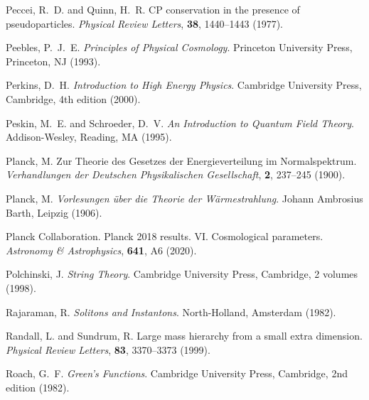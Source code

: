 \documentclass[12pt,a4paper]{article}
\begin{document}
\begin{thebibliography}{99}
		Peccei, R.~D. and Quinn, H.~R.
		\newblock CP conservation in the presence of pseudoparticles.
		\newblock \textit{Physical Review Letters}, \textbf{38}, 1440--1443 (1977).
		\newblock {}
		
		Peebles, P.~J.~E.
		\newblock \textit{Principles of Physical Cosmology}.
		\newblock Princeton University Press, Princeton, NJ (1993).
		
		Perkins, D.~H.
		\newblock \textit{Introduction to High Energy Physics}.
		\newblock Cambridge University Press, Cambridge, 4th edition (2000).
		
		Peskin, M.~E. and Schroeder, D.~V.
		\newblock \textit{An Introduction to Quantum Field Theory}.
		\newblock Addison-Wesley, Reading, MA (1995).
		
		Planck, M.
		\newblock Zur Theorie des Gesetzes der Energieverteilung im Normalspektrum.
		\newblock \textit{Verhandlungen der Deutschen Physikalischen Gesellschaft}, \textbf{2}, 237--245 (1900).
		
		Planck, M.
		\newblock \textit{Vorlesungen über die Theorie der Wärmestrahlung}.
		\newblock Johann Ambrosius Barth, Leipzig (1906).
		
		Planck Collaboration.
		\newblock Planck 2018 results. VI. Cosmological parameters.
		\newblock \textit{Astronomy \& Astrophysics}, \textbf{641}, A6 (2020).
		\newblock {}
		
		Polchinski, J.
		\newblock \textit{String Theory}.
		\newblock Cambridge University Press, Cambridge, 2 volumes (1998).
		
		Rajaraman, R.
		\newblock \textit{Solitons and Instantons}.
		\newblock North-Holland, Amsterdam (1982).
		
		Randall, L. and Sundrum, R.
		\newblock Large mass hierarchy from a small extra dimension.
		\newblock \textit{Physical Review Letters}, \textbf{83}, 3370--3373 (1999).
		\newblock {}
		
		Roach, G.~F.
		\newblock \textit{Green's Functions}.
		\newblock Cambridge University Press, Cambridge, 2nd edition (1982).
		

\end{thebibliography}
\end{document}
